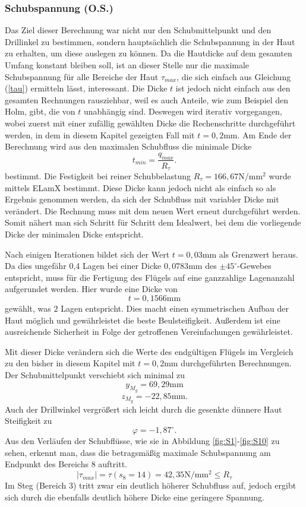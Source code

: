 \subsubsection{Schubspannung (O.S.)}
Das Ziel dieser Berechnung war nicht nur den Schubmittelpunkt und den Drillinkel zu bestimmen, sondern hauptsächlich die Schubspannung in der Haut zu erhalten, um diese auslegen zu können. Da die Hautdicke auf dem gesamten Umfang konstant bleiben soll, ist an dieser Stelle nur die maximale Schubspannung für alle Bereiche der Haut $\tau_{max}$, die sich einfach aus Gleichung (\ref{tau}) ermitteln lässt, interessant. Die Dicke $t$ ist jedoch nicht einfach aus den gesamten Rechnungen rausziehbar, weil es auch Anteile, wie zum Beispiel den Holm, gibt, die von $t$ unabhängig sind. Deswegen wird iterativ vorgegangen, wobei zuerst mit einer zufällig gewählten Dicke die Rechenschritte durchgeführt werden, in dem in diesem Kapitel gezeigten Fall mit $t=0,2\mathrm{mm}$. Am Ende der Berechnung wird aus den maximalen Schubfluss die minimale Dicke
\begin{equation}
	t_{min} = \frac{q_{max}}{R_{\tau}}.
\end{equation} 
bestimmt. Die Festigkeit bei reiner Schubbelastung $R_{\tau} = 166,67\mathrm{N/mm^2}$ wurde mittels ELamX bestimmt. Diese Dicke kann jedoch nicht als einfach so als Ergebnis genommen werden, da sich der Schubfluss mit variabler Dicke mit verändert. Die Rechnung muss mit dem neuen Wert erneut durchgeführt werden. Somit nähert man sich Schritt für Schritt dem Idealwert, bei dem die vorliegende Dicke der minimalen Dicke entspricht.

Nach einigen Iterationen bildet sich der Wert $t = 0,03\mathrm{mm}$ als Grenzwert heraus. Da dies ungefähr 0,4 Lagen bei einer Dicke $0,0783\mathrm{mm}$ des $\pm45^\circ$-Gewebes entspricht, muss für die Fertigung des Flügels auf eine ganzzahlige Lagenanzahl aufgerundet werden. Hier wurde eine Dicke von 
\begin{equation}
	t = 0,1566 \mathrm{mm}
\end{equation}
gewählt, was $2$ Lagen entspricht. Dies macht einen symmetrischen Aufbau der Haut möglich und gewährleistet die beste Beulsteifigkeit. Außerdem ist eine ausreichende Sicherheit in Folge der getroffenen Vereinfachungen gewährleistet.

Mit dieser Dicke verändern sich die Werte des endgültigen Flügels im Vergleich zu den bisher in diesem Kapitel mit $t=0,2\mathrm{mm}$ durchgeführten Berechnungen. Der Schubmittelpunkt verschiebt sich minimal zu
$$
	y_{M_{g}}=69,29\mathrm{mm}
$$
$$
	z_{M_{g}}=-22,85\mathrm{mm}.
$$
Auch der Drillwinkel vergrößert sich leicht durch die gesenkte dünnere Haut Steifigkeit zu
$$
	\varphi =-1,87 ^\circ.
$$
Aus den Verläufen der Schubflüsse, wie sie in Abbildung \ref{fig:S1}-\ref{fig:S10} zu sehen, erkennt man, dass die betragsmäßig maximale Schubspannung am Endpunkt des Bereichs 8 auftritt.
$$
	|\tau_{max}|=\tau(s_8=14)=42,35\mathrm{N/mm^2}\leq R_{\tau}
$$
Im Steg (Bereich 3) tritt zwar ein deutlich höherer Schubfluss auf, jedoch ergibt sich durch die ebenfalls deutlich höhere Dicke eine geringere Spannung.







